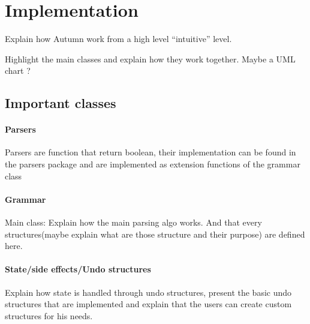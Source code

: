
	\section{Implementation}
	Explain how Autumn work from a high level ``intuitive'' level.

	Highlight the main classes and explain how they work together. Maybe a UML chart ?
		\subsection{Important classes}

		\paragraph{Parsers} Parsers are function that return boolean, their implementation can be found in the parsers package and are implemented as extension functions of the grammar class
		\paragraph{Grammar} Main class: Explain how the main parsing algo works. And that every structures(maybe explain what are those structure and their purpose) are defined here.
		\paragraph{State/side effects/Undo structures} Explain how state is handled through undo structures, present the basic undo structures that are implemented and explain that the users can create custom structures for his needs.




